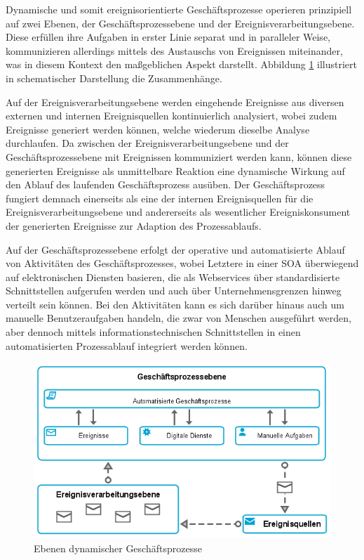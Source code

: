 Dynamische und somit ereignisorientierte Geschäftsprozesse operieren prinzipiell auf zwei Ebenen, der Geschäftsprozessebene und der Ereignisverarbeitungsebene. 
Diese erfüllen ihre Aufgaben in erster Linie separat und in paralleler Weise, kommunizieren allerdings mittels des Austauschs von Ereignissen miteinander, was in diesem Kontext den maßgeblichen Aspekt darstellt. 
Abbildung \ref{fig:Ebenen dynamischer Geschäftsprozesse} illustriert in schematischer Darstellung die Zusammenhänge.

Auf der Ereignisverarbeitungsebene werden eingehende Ereignisse aus diversen externen und internen Ereignisquellen kontinuierlich analysiert, wobei zudem Ereignisse generiert werden können, welche wiederum dieselbe Analyse durchlaufen. 
Da zwischen der Ereignisverarbeitungsebene und der Geschäftsprozessebene mit Ereignissen kommuniziert werden kann, können diese generierten Ereignisse als unmittelbare Reaktion eine dynamische Wirkung auf den Ablauf des laufenden Geschäftsprozess ausüben.
Der Geschäftsprozess fungiert demnach einerseits als eine der internen Ereignisquellen für die Ereignisverarbeitungsebene und andererseits als wesentlicher Ereigniskonsument der generierten Ereignisse zur Adaption des Prozessablaufs.
\cite{Benker.2016}

Auf der Geschäftsprozessebene erfolgt der operative und automatisierte Ablauf von Aktivitäten des Geschäftsprozesses, wobei Letztere in einer \ac{SOA} überwiegend auf elektronischen Diensten basieren, die als Webservices über standardisierte Schnittstellen aufgerufen werden und auch über Unternehmensgrenzen hinweg verteilt sein können.
\cite{Finger.2009}
Bei den Aktivitäten kann es sich darüber hinaus auch um manuelle Benutzeraufgaben handeln, die zwar von Menschen ausgeführt werden, aber dennoch mittels informationstechnischen Schnittstellen in einen automatisierten Prozessablauf integriert werden können.
\cite{Bruns.2010}

\begin{figure}[H]
	\centering 
    \includegraphics[width=\textwidth]{img/dynamicbp.png}	
    \caption[Ebenen dynamischer Geschäftsprozesse]
    {Ebenen dynamischer Geschäftsprozesse \protect\footnotemark}
    \label{fig:Ebenen dynamischer Geschäftsprozesse}
\end{figure}


